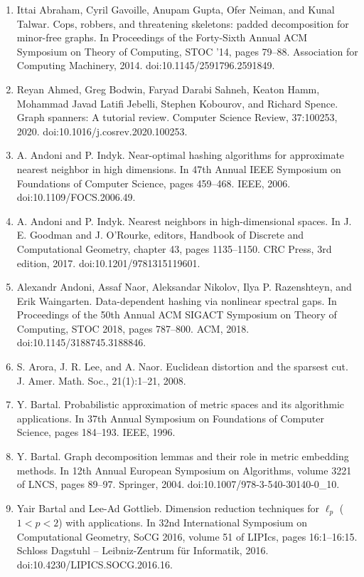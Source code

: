 \documentclass[10pt,a4paper]{amsart}
\begin{document}
\begin{enumerate}
\item  [1]  Ittai Abraham, Cyril Gavoille, Anupam Gupta, Ofer Neiman, and Kunal Talwar.  Cops, robbers, and threatening skeletons: padded decomposition for minor-free graphs.  In Proceedings of the Forty-Sixth Annual ACM Symposium on Theory of Computing, STOC ’14, pages 79–88. Association for Computing Machinery, 2014.  doi:10.1145/2591796.2591849.  
\item  [2]  Reyan Ahmed, Greg Bodwin, Faryad Darabi Sahneh, Keaton Hamm, Mohammad Javad Latifi Jebelli, Stephen Kobourov, and Richard Spence.  Graph spanners: A tutorial review.  Computer Science Review, 37:100253, 2020.  doi:10.1016/j.cosrev.2020.100253.  
\item  [3]  A. Andoni and P. Indyk.  Near-optimal hashing algorithms for approximate nearest neighbor in high dimensions.  In 47th Annual IEEE Symposium on Foundations of Computer Science, pages 459–468. IEEE, 2006.  doi:10.1109/FOCS.2006.49.  
\item  [4]  A. Andoni and P. Indyk.  Nearest neighbors in high-dimensional spaces.  In J. E. Goodman and J. O’Rourke, editors, Handbook of Discrete and Computational Geometry, chapter 43, pages 1135–1150. CRC Press, 3rd edition, 2017.  doi:10.1201/9781315119601.  
\item  [5]  Alexandr Andoni, Assaf Naor, Aleksandar Nikolov, Ilya P. Razenshteyn, and Erik Waingarten.  Data-dependent hashing via nonlinear spectral gaps.  In Proceedings of the 50th Annual ACM SIGACT Symposium on Theory of Computing, STOC 2018, pages 787–800. ACM, 2018.  doi:10.1145/3188745.3188846.  
\item  [6]  S. Arora, J. R. Lee, and A. Naor.  Euclidean distortion and the sparsest cut.  J. Amer. Math. Soc., 21(1):1–21, 2008.  
\item  [7]  Y. Bartal.  Probabilistic approximation of metric spaces and its algorithmic applications.  In 37th Annual Symposium on Foundations of Computer Science, pages 184–193. IEEE, 1996.  
\item  [8]  Y. Bartal.  Graph decomposition lemmas and their role in metric embedding methods.  In 12th Annual European Symposium on Algorithms, volume 3221 of LNCS, pages 89–97. Springer, 2004.  doi:10.1007/978-3-540-30140-0\_10.  
\item  [9]  Yair Bartal and Lee-Ad Gottlieb.  Dimension reduction techniques for $\ell_{p}$ ($1<p<2$) with applications.  In 32nd International Symposium on Computational Geometry, SoCG 2016, volume 51 of LIPIcs, pages 16:1–16:15. Schloss Dagstuhl – Leibniz-Zentrum für Informatik, 2016.  doi:10.4230/LIPICS.SOCG.2016.16.  

\end{enumerate}
\end{document}
